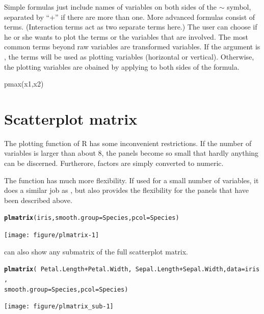 \documentclass[11pt]{article}\usepackage[]{graphicx}\usepackage[]{color}
\makeatletter
\newcommand{\hlopt}[1]{\textcolor[rgb]{0,0,0}{#1}}%
\newcommand{\hlstd}[1]{\textcolor[rgb]{0.345,0.345,0.345}{#1}}%
\newcommand{\hlkwc}[1]{\textcolor[rgb]{0.333,0.667,0.333}{#1}}%
\newcommand{\hlkwd}[1]{\textcolor[rgb]{0.737,0.353,0.396}{\textbf{#1}}}%
\newenvironment{kframe}{%
 \def\at@end@of@kframe{}%
 \ifinner\ifhmode%
  \def\at@end@of@kframe{\end{minipage}}%
  \begin{minipage}{\columnwidth}%
 \fi\fi%
 \def\FrameCommand##1{\hskip\@totalleftmargin \hskip-\fboxsep
 \colorbox{shadecolor}{##1}\hskip-\fboxsep
     \hskip-\linewidth \hskip-\@totalleftmargin \hskip\columnwidth}%
 \MakeFramed {\advance\hsize-\width
   \@totalleftmargin\z@ \linewidth\hsize
   \@setminipage}}%
 {\par\unskip\endMakeFramed%
 \at@end@of@kframe}
\newenvironment{knitrout}{}{} %
\makeatother
\begin{document}

Simple formulas just include names of variables on both sides of the $\sim$
symbol, separated by ``+'' if there are more than one. 
More advanced formulas consist of terms.
(Interaction terms act as two separate terms here.)
The user can choose if he or she wants to plot the terms or the variables
that are involved. 
The most common terms beyond raw variables are transformed variables.
If the argument  is , the terms will be used as
plotting variables (horizontal or vertical). 
Otherwise, the plotting variables are obained by applying  to
both sides of the formula.


pmax(x1,x2)


\section{Scatterplot matrix}
The  plotting function of R has some inconvenient restrictions.
If the number of variables is larger than about 8, the panels become so
small that hardly anything can be discerned. Furtherore, factors are simply 
converted to numeric.

The function  has much more flexibility. 
If used for a small number of variables, it does a similar job as 
, but also provides the flexibility for the panels that have been
described above.

\begin{knitrout}
\color{fgcolor}\begin{kframe}
\begin{alltt}
\hlkwd{plmatrix}\hlstd{(iris,} \hlkwc{smooth.group}\hlstd{=Species,} \hlkwc{pcol}\hlstd{=Species)}
\end{alltt}


{\ttfamily\noindent\bfseries\color{errorcolor}{\#\# Error in smoothline\$y[lig, 1]: incorrect number of dimensions}}\end{kframe}
\texttt{[image: figure/plmatrix-1]} 

\end{knitrout}

 can also show any submatrix of the full scatterplot matrix.
\begin{knitrout}
\color{fgcolor}\begin{kframe}
\begin{alltt}
\hlkwd{plmatrix}\hlstd{(}\hlopt{~}\hlstd{Petal.Length}\hlopt{+}\hlstd{Petal.Width,} \hlopt{~}\hlstd{Sepal.Length}\hlopt{+}\hlstd{Sepal.Width,} \hlkwc{data}\hlstd{=iris,}
         \hlkwc{smooth.group}\hlstd{=Species,} \hlkwc{pcol}\hlstd{=Species)}
\end{alltt}


{\ttfamily\noindent\bfseries\color{errorcolor}{\#\# Error in smoothline\$y[lig, 1]: incorrect number of dimensions}}\end{kframe}
\texttt{[image: figure/plmatrix\_sub-1]} 

\end{knitrout}
\end{document}
